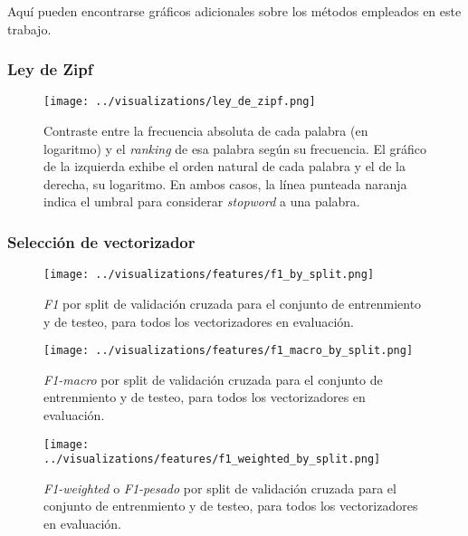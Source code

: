 Aqu\'i pueden encontrarse gr\'aficos adicionales sobre los m\'etodos empleados
en este trabajo.

\subsubsection{Ley de Zipf}
\label{appendix-plots-zipf-law}

\begin{figure}[!htb]
    \centering
    \texttt{[image: ../visualizations/ley\_de\_zipf.png]}
    \caption{Contraste entre la frecuencia absoluta de cada palabra (en logaritmo)
    y el \textit{ranking} de esa palabra seg\'un su frecuencia. El gr\'afico de la
    izquierda exhibe el orden natural de cada palabra y el de la derecha, su logaritmo.
    En ambos casos, la l\'inea punteada naranja indica el umbral
    para considerar \textit{stopword} a una palabra.}
    \label{fig-zipf-law}
\end{figure}
\FloatBarrier

\subsubsection{Selecci\'on de vectorizador}
\label{appendix-plots-vectorizers}

\begin{figure}[!htb]
    \centering
    \texttt{[image: ../visualizations/features/f1\_by\_split.png]}
    \caption{\textit{F1} por split de validaci\'on cruzada para el conjunto
    de entrenmiento y de testeo, para todos los vectorizadores en evaluaci\'on.}
    \label{fig-vectorizers-f1}
\end{figure}
\FloatBarrier

\begin{figure}[!htb]
    \centering
    \texttt{[image: ../visualizations/features/f1\_macro\_by\_split.png]}
    \caption{\textit{F1-macro} por split de validaci\'on cruzada para el conjunto
    de entrenmiento y de testeo, para todos los vectorizadores en evaluaci\'on.}
    \label{fig-vectorizers-f1-macro}
\end{figure}
\FloatBarrier

\begin{figure}[!htb]
    \centering
    \texttt{[image: ../visualizations/features/f1\_weighted\_by\_split.png]}
    \caption{\textit{F1-weighted} o \textit{F1-pesado} por split de validaci\'on
    cruzada para el conjunto de entrenmiento y de testeo, para todos los
    vectorizadores en evaluaci\'on.}
    \label{fig-vectorizers-f1-weighted}
\end{figure}
\FloatBarrier

